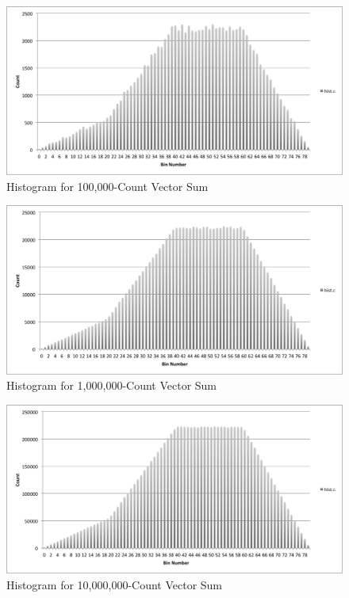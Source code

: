 \documentclass{acm_proc_article-sp}
\begin{document}
\begin{figure}[tbp]
  \centering
  \caption{Histogram for 100,000-Count Vector Sum}
	\label{hist100000c}
  \includegraphics[width=40pc]{Pics/100000c.png}
\end{figure}

\begin{figure}[tbp]
  \centering
  \caption{Histogram for 1,000,000-Count Vector Sum}
	\label{hist1000000c}
  \includegraphics[width=40pc]{Pics/1000000c.png}
\end{figure}

\begin{figure}[tbp]
  \centering
  \caption{Histogram for 10,000,000-Count Vector Sum}
	\label{hist10000000c}
  \includegraphics[width=40pc]{Pics/10000000c.png}
\end{figure}
\end{document}
